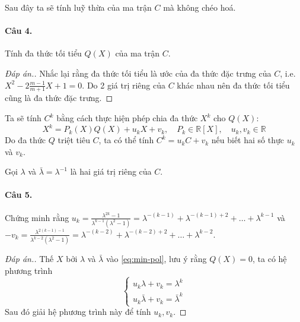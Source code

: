 \documentclass[11pt]{article}
\begin{document}
Sau đây ta sẽ tính luỹ thừa của ma trận \(C\) mà không chéo hoá.

\paragraph{Câu 4.}
\label{sec:org931b7ff}
Tính đa thức tối tiểu \(Q(X)\) của ma trận \(C\).
\begin{proof}[Đáp án.]
Nhắc lại rằng đa thức tối tiểu là ước của đa thức đặc trưng của \(C\), i.e. \(X^2 - 2 \frac{m-1}{m+1} X + 1 = 0\). Do 2 giá trị
riêng của \(C\) khác nhau nên đa thức tối tiểu cũng là đa thức đặc trưng.
\end{proof}

Ta sẽ tính \(C^k\) bằng cách thực hiện phép chia đa thức \(X^k\) cho \(Q(X)\):
\begin{equation}
\label{eq:min-pol}
 X^k = P_k(X)Q(X) + u_k X + v_k, \quad P_k\in \mathbb{R}[X], \quad u_k, v_k\in \mathbb{R}
\end{equation}
Do đa thức \(Q\) triệt tiêu \(C\), ta có thể tính \(C^k = u_k C + v_k\) nếu biết hai
số thực \(u_k\) và \(v_k\). 

Gọi \(\lambda\) và \(\bar\lambda = \lambda^{-1}\) là hai
giá trị riêng của \(C\).


\paragraph{Câu 5.}
\label{sec:orgbe50be4}
Chứng minh rằng \(u_k = \frac{\lambda^{2k} - 1}{\lambda^{k-1}(\lambda^2-1)} =
\lambda^{-(k-1)} + \lambda^{-(k-1) + 2} + \dots + \lambda^{k-1}\) và \(-v_k
=  \frac{\lambda^{2(k-1) - 1}}{\lambda^{k-2} (\lambda^2-1)} = \lambda^{-(k-2)} +
\lambda^{-(k-2) + 2} + \dots + \lambda^{k-2}\).
\begin{proof}[Đáp án.]
Thế \(X\) bởi \(\lambda\) và \(\bar \lambda\) vào
\eqref{eq:min-pol}, lưu ý rằng \(Q(X)=0\), ta có hệ phương trình
\begin{equation*}
 \begin{cases}
u_k\lambda + v_k = \lambda^k   \\
u_k\bar \lambda + v_k = \bar\lambda^k 
 \end{cases}
\end{equation*}
Sau đó giải hệ phương trình này để tính \(u_k, v_k\).
\end{proof}
\end{document}
